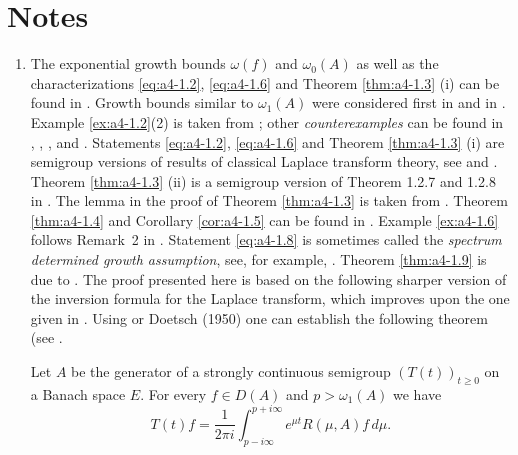 \section*{Notes}
\begin{enumerate}[%
label={\Large \emph{Section \arabic*:}}
, wide
, labelindent = 0.0em]

\item 
The exponential growth bounds $\omega(f)$ and $\omega_0(A)$ as well as the characterizations \eqref{eq:a4-1.2}, \eqref{eq:a4-1.6} and Theorem \ref{thm:a4-1.3} (i) can be found in \citet{hillephillips:1957}.
Growth bounds similar to $\omega_{1}(A)$ were considered first in \citet{djacenko:1976} and in \citet[Prop.2]{zabczyk:1979}. 
Example \ref{ex:a4-1.2}(2) is taken from \citet{wolff:1981}; other \emph{counterexamples} can be found in \citet{hillephillips:1957}, \citet{foias:1973}, \citet{triggiani:1975}, 
\citet{zabczyk:1975} and \citet{greineretal:1981}. 
Statements \eqref{eq:a4-1.2}, \eqref{eq:a4-1.6} and Theorem \ref{thm:a4-1.3} (i) are semigroup versions of results of classical Laplace transform theory, see \citet{hillephillips:1957} and \citet{widder:1946}. 
Theorem \ref{thm:a4-1.3} (ii) is a semigroup version of Theorem 1.2.7 and 1.2.8 in \citet{doetsch:1950}. 
The lemma in the proof of Theorem \ref{thm:a4-1.3} is taken from \citet{milstein:1975}. 
Theorem \ref{thm:a4-1.4} and Corollary \ref{cor:a4-1.5} can be found in \citet{neubrander:1985a}. 
Example \ref{ex:a4-1.6} follows Remark~2 in \citet{zabczyk:1975}. 
Statement \eqref{eq:a4-1.8} is sometimes called the \emph{spectrum determined growth assumption}, see, for example, \citet{triggiani:1975b}. 
Theorem \ref{thm:a4-1.9} is due to \citet{slemrod:1976}. 
The proof presented here is based on the following sharper version of the inversion formula for the Laplace transform, which improves upon the one given in \citet[p.349]{hillephillips:1957}. 
Using \citet[p.66]{widder:1946} or \citet[p.212]{doetsch:1950}Doetsch (1950) one can establish the following theorem (see \citet{neubrander:1984b}.

\begin{theorem}\label{thm:a4-2.6}
Let $A$ be the generator of a strongly continuous semigroup $(T(t))_{t \geq 0}$ on a Banach space $E$. 
For every $f \in D(A)$ and $p > \omega_{1}(A)$ we have
\[
T(t)f = \frac{1}{2\pi i} \int_{p-i\infty}^{p+i\infty} e^{\mu t}R(\mu,A)f \, d\mu.
\]
\end{theorem}


\end{enumerate}
